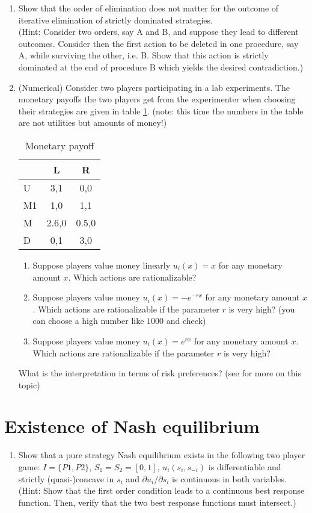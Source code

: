 \documentclass[a4paper,12pt]{article}
\begin{document}
\begin{enumerate}
\item Show that the order of elimination does not matter for the outcome of iterative elimination of strictly dominated strategies. \\(Hint: Consider two orders, say A and B, and suppose they lead to different outcomes. Consider then the first action to be deleted in one procedure, say A, while surviving the other, i.e. B. Show that this action is strictly dominated at the end of procedure B which yields the desired contradiction.)
\item (Numerical) Consider two players participating in a lab experiments. The monetary payoffs the two players get from the experimenter when choosing their strategies are given in table \ref{tab:monRatio}. (note: this time the numbers in the table are not utilities but amounts of money!)
  \begin{table}[h]
    \centering
    \begin{tabular}{l|c|c}
      & L &R\\ \hline
      U& 3,1  &0,0  \\
      M1&1,0&1,1 \\
      M&2.6,0  &0.5,0 \\
      D& 0,1 & 3,0
    \end{tabular}
    \caption{Monetary payoff}
    \label{tab:monRatio}
  \end{table}
  \begin{enumerate}
  \item Suppose players value money linearly $u_i(x)=x$ for any monetary amount $x$. Which actions are rationalizable?
  \item Suppose players value money  $u_i(x)=-e^{-r x}$ for any monetary amount $x$. Which actions are rationalizable if the parameter $r$ is very high? (you can choose a high number like $1000$ and check)
     \item Suppose players value money $u_i(x)=e^{r x}$ for any monetary amount $x$. Which actions are rationalizable if the parameter $r$ is very high?
     \end{enumerate}
     What is the interpretation in terms of risk preferences? (see \cite{weinstein2016effect} for more on this topic)
\end{enumerate}


\section{Existence of Nash equilibrium}
\label{sec:nash-theorem-fixed}

\begin{enumerate}
\item Show that a pure strategy Nash equilibrium exists in the following two player game: $I=\{P1,P2\}$, $S_1=S_2=[0,1]$, $u_i(s_i,s_{-i})$ is differentiable and strictly (quasi-)concave in $s_i$ and $\partial u_i/\partial s_i$ is continuous in both variables.\\
  (Hint: Show that the first order condition leads to a continuous best response function. Then, verify that the two best response functions must intersect.)
\end{enumerate}



\end{document}
